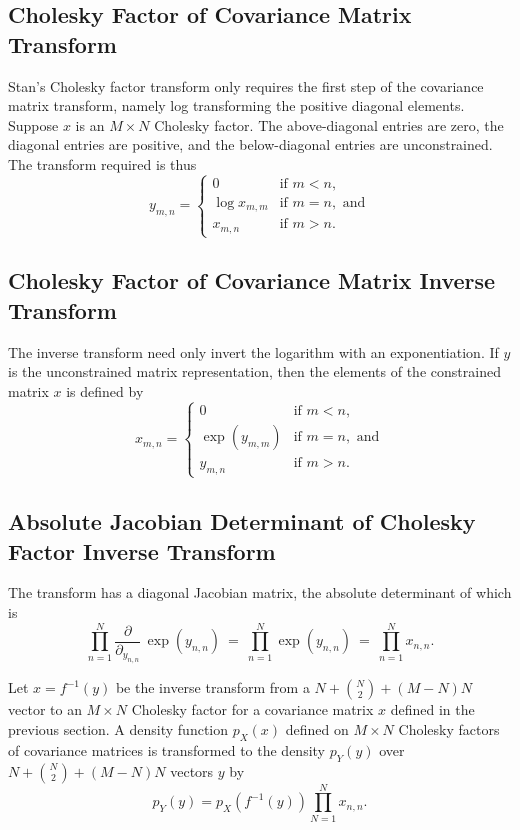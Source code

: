 \subsection{Cholesky Factor of Covariance Matrix Transform}

Stan's Cholesky factor transform only requires the first step of the
covariance matrix transform, namely log transforming the positive
diagonal elements.  Suppose $x$ is an $M \times N$ Cholesky factor.
The above-diagonal entries are zero, the diagonal entries are
positive, and the below-diagonal entries are unconstrained.  The
transform required is thus
%
\[
y_{m,n} = 
\left\{
\begin{array}{cl}
0 & \mbox{if } m < n,
\\[4pt]
\log x_{m,m} & \mbox{if } m = n, \mbox{ and}
\\[4pt]
x_{m,n} & \mbox{if } m > n.
\end{array}
\right.
\]

\subsection{Cholesky Factor of Covariance Matrix Inverse Transform}

The inverse transform need only invert the logarithm with an
exponentiation.  If $y$ is the unconstrained matrix representation,
then the elements of the constrained matrix $x$ is defined by
\[
x_{m,n} =
\left\{
\begin{array}{cl}
0 & \mbox{if } m < n,
\\[4pt]
\exp(y_{m,m}) & \mbox{if } m = n, \mbox{ and}
\\[4pt]
y_{m,n} & \mbox{if } m > n.
\end{array}
\right.
\]

\subsection{Absolute Jacobian Determinant of Cholesky Factor Inverse Transform}

The transform has a diagonal Jacobian matrix, the absolute determinant
of which is
%
\[
\prod_{n=1}^N  \frac{\partial}{\partial_{y_{n,n}}} \, \exp(y_{n,n})
\ = \ 
\prod_{n=1}^N \exp(y_{n,n})
\ = \
\prod_{n=1}^N x_{n,n}.
\]

Let $x = f^{-1}(y)$ be the inverse transform from a $N + \binom{N}{2}
+ (M - N)N$ vector to an $M \times N$ Cholesky factor for a covariance
matrix $x$ defined in the previous section.  A density function
$p_X(x)$ defined on $M \times N$ Cholesky factors of covariance
matrices is transformed to the density $p_Y(y)$ over $N + \binom{N}{2}
+ (M - N)N$ vectors $y$ by
%
\[
p_Y(y) = p_X(f^{-1}(y)) \prod_{N=1}^N x_{n,n}.
\]

